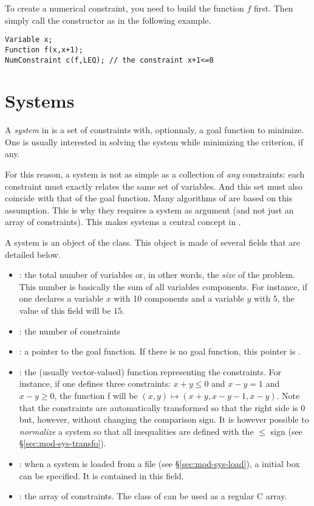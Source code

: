 To create a numerical constraint, you need to build the function $f$ first.
Then simply call the constructor as in the following example.

\begin{lstlisting}
Variable x;
Function f(x,x+1);
NumConstraint c(f,LEQ); // the constraint x+1<=0
\end{lstlisting}	

\section{Systems}

A {\it system} in \ibex is a set of constraints with, optionnaly, a goal function to minimize.
One is usually interested in solving the system while minimizing the criterion, if any.

For this reason, a system is not as simple as a collection of {\it any} constraints:
each constraint must exactly relates the same set of variables. And this set must
also coincide with that of the goal function.
Many algorithms of \ibex are based on this assumption.
This is why they requires a system as argument (and not just an array of constraints).
This makes systems a central concept in \ibex.

A system is an object of the  class. This object is made of several fields
that are detailed below. %

\begin{itemize}
\item {} : the total number of variables or, in other words, the
{\it size} of the problem. This number is basically the sum of all variables components. For instance,
if one declares a variable $x$ with 10 components and a variable $y$ with 5, the value of this field
will be $15$.
\item {} : the number of constraints
\item {} : a pointer to the goal function. If there is no goal function, this
pointer is .
\item {} : the (usually vector-valued) function representing the constraints. 
For instance, if one defines three constraints: $x+y\leq0$ and $x-y=1$ and $x-y\geq0$, the function f will be 
$(x,y)\mapsto (x+y,x-y-1,x-y)$. Note that the constraints are automatically transformed so that the right side 
is 0 but, however, without changing the comparison sign. It is however possible to {\it normalize} a system so that
all inequalities are defined with the $\le$ sign (see \S\ref{sec:mod-sys-transfo}).
\item {} : when a system is loaded from a file (see \S\ref{sec:mod-sys-load}),
a initial box can be specified. It is contained in this field.
\item {} : the array of constraints. The  class of \ibex can
be used as a regular C array.
\end{itemize}

